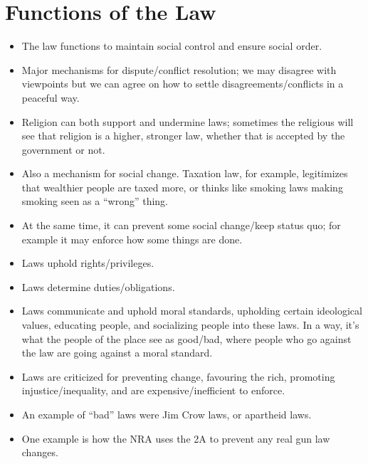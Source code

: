 \documentclass{article}
\begin{document}
\section{Functions of the Law}
\begin{itemize}
    \item The law functions to maintain social control and ensure social order.
    \item Major mechanisms for dispute/conflict resolution; we may disagree with viewpoints but we can agree on how to settle disagreements/conflicts in a peaceful way.
    \item Religion can both support and undermine laws; sometimes the religious will see that religion is a higher, stronger law, whether that is accepted by the government or not.
    \item Also a mechanism for social change.  Taxation law, for example, legitimizes that wealthier people are taxed more, or thinks like smoking laws making smoking seen as a ``wrong'' thing.
    \item At the same time, it can prevent some social change/keep status quo; for example it may enforce how some things are done.
    \item Laws uphold rights/privileges.
    \item Laws determine duties/obligations.
    \item Laws communicate and uphold moral standards, upholding certain ideological values, educating people, and socializing people into these laws.  In a way, it's what the people of the place see as good/bad, where people who go against the law are going against a moral standard.
    \item Laws are criticized for preventing change, favouring the rich, promoting injustice/inequality, and are expensive/inefficient to enforce.
    \item An example of ``bad'' laws were Jim Crow laws, or apartheid laws.
    \item One example is how the NRA uses the 2A to prevent any real gun law changes.
\end{itemize}
\end{document}

